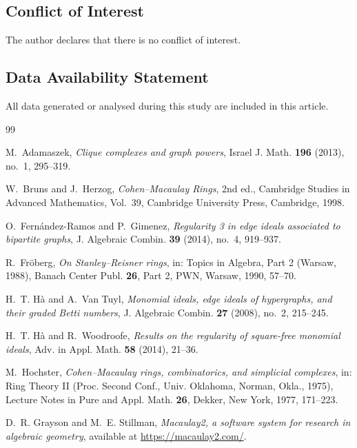 \documentclass[12pt,reqno]{amsart}
\theoremstyle{definition}
\numberwithin{equation}{section}
\begin{document}
\subsection*{Conflict of Interest}

The author declares that there is no conflict of interest.

\subsection*{Data Availability Statement}

All data generated or analysed during this study are included in this
article.

\begin{thebibliography}{99}
	
	M.~Adamaszek,
	\emph{Clique complexes and graph powers},
	Israel J. Math. \textbf{196} (2013), no.~1, 295--319.
	
W.~Bruns and J.~Herzog,
\emph{Cohen--Macaulay Rings},
2nd ed., Cambridge Studies in Advanced Mathematics, Vol.~39,
Cambridge University Press, Cambridge, 1998.
	
	O.~Fern\'andez-Ramos and P.~Gimenez,
	\emph{Regularity 3 in edge ideals associated to bipartite graphs},
	J. Algebraic Combin. \textbf{39} (2014), no.~4, 919--937.
	
	R.~Fr\"oberg,
	\emph{On Stanley--Reisner rings},
	in: Topics in Algebra, Part 2 (Warsaw, 1988),
	Banach Center Publ. \textbf{26}, Part 2,
	PWN, Warsaw, 1990, 57--70.
	
	H.~T. H\`a and A.~Van Tuyl,
	\emph{Monomial ideals, edge ideals of hypergraphs, and their graded
		Betti numbers},
	J. Algebraic Combin. \textbf{27} (2008), no.~2, 215--245.
	
	H.~T. H\`a and R.~Woodroofe,
	\emph{Results on the regularity of square-free monomial ideals},
	Adv. in Appl. Math. \textbf{58} (2014), 21--36.
	
	M.~Hochster,
	\emph{Cohen--Macaulay rings, combinatorics, and simplicial complexes},
	in: Ring Theory II (Proc. Second Conf., Univ. Oklahoma, Norman,
	Okla., 1975), Lecture Notes in Pure and Appl. Math. \textbf{26},
	Dekker, New York, 1977, 171--223.
	
	D.~R. Grayson and M.~E. Stillman,
	\emph{Macaulay2, a software system for research in algebraic geometry},
	available at \url{https://macaulay2.com/}.
	

\end{thebibliography}
\end{document}
